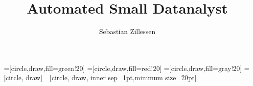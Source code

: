 \documentclass[isdraft]{kclthesis}  %
\title{Automated Small Datanalyst}
\author{Sebastian Zillessen}
\begin{document}


\maketitle 		%
\maketitleTwo 	%

\newpage
\thispagestyle{empty}
\mbox{}
\newpage


\setcounter{tocdepth}{4}
\tableofcontents
\newpage


\fancyhead{}
\fancyfoot{}
\pagestyle{fancy} 
\fancyhead[RO,LE]{\sffamily\small \thepage}
\fancyhead[LO,RE]{\sffamily\small \nouppercase{\rightmark}}
\renewcommand{\headrulewidth}{0.4pt}
\renewcommand{\footrulewidth}{0.0pt}

\newcommand{\R}{\mathcal{R}}
\renewcommand{\S}{\mathcal{S}}
\renewcommand{\D}{\mathcal{D}}

\newcommand{\low}[1]{{\tiny $_{#1}$}}
\newcommand{\tbd}[1]{\todo{TBD}{\color{gray} #1}}

=[circle,draw,fill=green!20]
=[circle,draw,fill=red!20]
=[circle,draw,fill=gray!20]
=[circle, draw]
=[circle, draw, inner sep=1pt,minimum size=20pt]








%
%


%

%

 


\appendix



\end{document}

